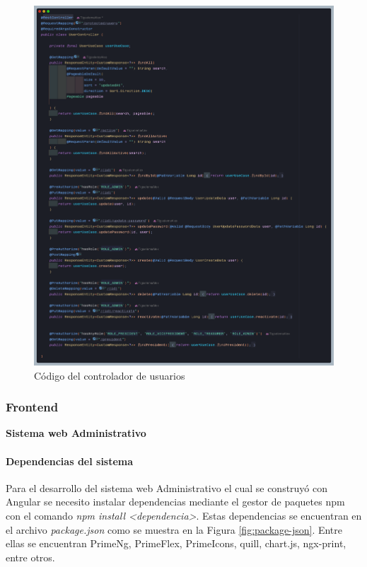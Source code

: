 \begin{figure}[H]
    \centering
    \includegraphics[width=1\textwidth]{resources/images/userController}
    \caption{Código del controlador de usuarios}
    \label{fig:user-controller}
\end{figure}

\subsubsection{Frontend}

\textbf{Sistema web Administrativo}
\bigbreak
\paragraph{Dependencias del sistema}

Para el desarrollo del sistema web Administrativo el cual se construyó con Angular se necesito instalar dependencias mediante el gestor de paquetes npm con el comando \textit{npm install <dependencia>}.
Estas dependencias se encuentran en el archivo \textit{package.json} como se muestra en la Figura \ref{fig:package-json}.
Entre ellas se encuentran PrimeNg, PrimeFlex, PrimeIcons, quill, chart.js, ngx-print, entre otros.

